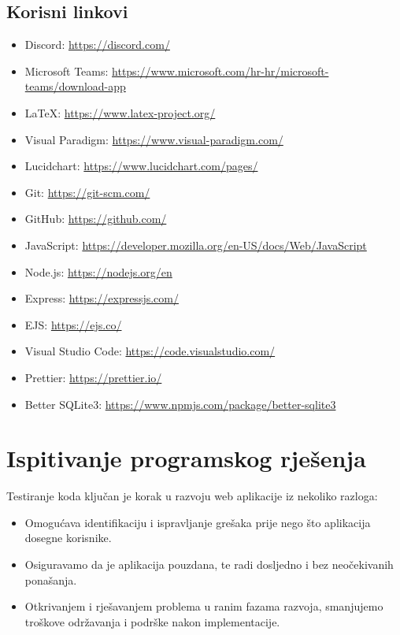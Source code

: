 		\subsection*{Korisni linkovi}
			\begin{itemize}
				\item Discord: \url{https://discord.com/}
				\item Microsoft Teams: \url{https://www.microsoft.com/hr-hr/microsoft-teams/download-app}
				\item LaTeX: \url{https://www.latex-project.org/}
				\item Visual Paradigm: \url{https://www.visual-paradigm.com/}
				\item Lucidchart: \url{https://www.lucidchart.com/pages/}
				\item Git: \url{https://git-scm.com/}
				\item GitHub: \url{https://github.com/}
				\item JavaScript: \url{https://developer.mozilla.org/en-US/docs/Web/JavaScript}
				\item Node.js: \url{https://nodejs.org/en}
				\item Express: \url{https://expressjs.com/}
				\item EJS: \url{https://ejs.co/}
				\item Visual Studio Code: \url{https://code.visualstudio.com/}
				\item Prettier: \url{https://prettier.io/}
				\item Better SQLite3: \url{https://www.npmjs.com/package/better-sqlite3}
			\end{itemize}

				
			\eject 
		
	
		\section{Ispitivanje programskog rješenja}

			Testiranje koda ključan je korak u razvoju web aplikacije iz nekoliko razloga:
			\begin{itemize}
				\item Omogućava identifikaciju i ispravljanje grešaka prije nego što aplikacija dosegne korisnike.
				\item Osiguravamo da je aplikacija pouzdana, te radi dosljedno i bez neočekivanih ponašanja.
				\item Otkrivanjem i rješavanjem problema u ranim fazama razvoja, smanjujemo troškove održavanja i podrške nakon implementacije.
			\end{itemize}

